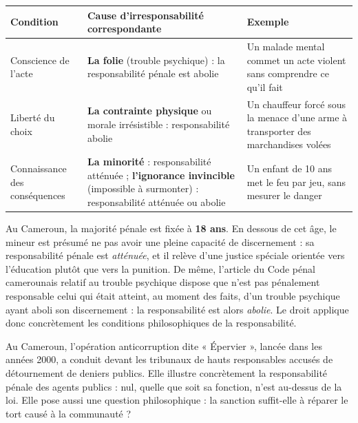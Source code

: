 \documentclass[11pt]{article}
\newcommand{\cle}[1]{{\popxbold\color{popdark}#1}}
\begin{document}
\begin{center}
\begin{tabularx}{\linewidth}{|l|X|X|}
\hline
\rowcolor{popblueL} \textbf{Condition} & \textbf{Cause d'irresponsabilité correspondante} & \textbf{Exemple} \\
\hline
Conscience de l'acte & \textbf{La folie} (trouble psychique) : la responsabilité pénale est abolie & Un malade mental commet un acte violent sans comprendre ce qu'il fait \\
\hline
Liberté du choix & \textbf{La contrainte physique} ou morale irrésistible : responsabilité abolie & Un chauffeur forcé sous la menace d'une arme à transporter des marchandises volées \\
\hline
Connaissance des conséquences & \textbf{La minorité} : responsabilité atténuée ; \textbf{l'ignorance invincible} (impossible à surmonter) : responsabilité atténuée ou abolie & Un enfant de 10 ans met le feu par jeu, sans mesurer le danger \\
\hline
\end{tabularx}
\end{center}

\begin{exemplebox}
Au Cameroun, la \cle{majorité pénale} est fixée à \textbf{18 ans}. En dessous de cet âge, le mineur est présumé ne pas avoir une pleine capacité de discernement : sa responsabilité pénale est \emph{atténuée}, et il relève d'une justice spéciale orientée vers l'éducation plutôt que vers la punition. De même, l'article du Code pénal camerounais relatif au trouble psychique dispose que n'est pas pénalement responsable celui qui était atteint, au moment des faits, d'un trouble psychique ayant aboli son discernement : la responsabilité est alors \emph{abolie}. Le droit applique donc concrètement les conditions philosophiques de la responsabilité.
\end{exemplebox}

\begin{savaistu}
Au Cameroun, l'opération anticorruption dite « \cle{Épervier} », lancée dans les années 2000, a conduit devant les tribunaux de hauts responsables accusés de détournement de deniers publics. Elle illustre concrètement la responsabilité pénale des agents publics : nul, quelle que soit sa fonction, n'est au-dessus de la loi. Elle pose aussi une question philosophique : la sanction suffit-elle à réparer le tort causé à la communauté ?
\end{savaistu}
\end{document}
